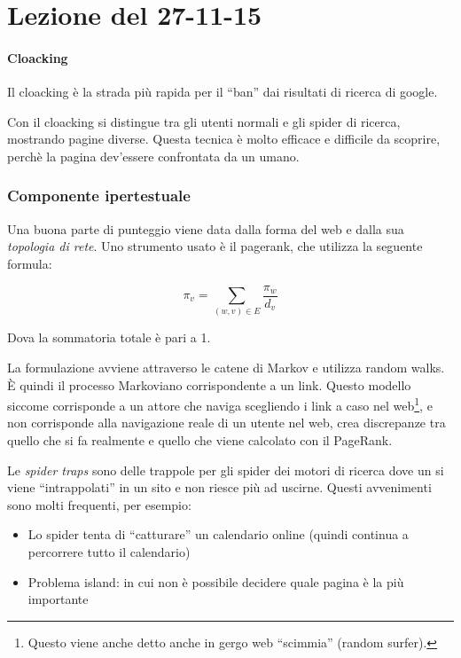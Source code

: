 \section{Lezione del 27-11-15}


\paragraph*{Cloacking}Il cloacking \`e la strada pi\`u rapida per il ``ban'' dai risultati di ricerca di google.

Con il cloacking si distingue tra gli utenti normali e gli spider di ricerca, mostrando pagine diverse. Questa tecnica \`e molto efficace e difficile da scoprire, perch\`e la pagina dev'essere confrontata da un umano.

\subsubsection{Componente ipertestuale}
Una buona parte di punteggio viene data dalla forma del web e dalla sua \textit{topologia di rete}.
Uno strumento usato \`e il pagerank, che utilizza la seguente formula:

\[ \pi_v = \sum_{(w,v) \in E}\frac{\pi_w}{d_v} \]

Dova la sommatoria totale \`e pari a 1.

La formulazione avviene attraverso le catene di Markov e utilizza random walks. \`E quindi il processo Markoviano corrispondente a un link. Questo modello siccome corrisponde a un attore che naviga scegliendo i link a caso nel web\footnote{Questo viene anche detto anche in gergo web ``scimmia'' (random surfer).}, e non corrisponde alla navigazione reale di un utente nel web, crea discrepanze tra quello che si fa realmente e quello che viene calcolato con il PageRank.

Le \textit{spider traps} sono delle trappole per gli spider dei motori di ricerca dove un si viene ``intrappolati'' in un sito e non riesce pi\`u ad uscirne. Questi avvenimenti sono molti frequenti, per esempio:
\begin{itemize}

\item Lo spider tenta di ``catturare'' un calendario online (quindi continua a percorrere tutto il calendario)
\item Problema island: in cui non \`e possibile decidere quale pagina \`e la pi\`u importante

\end{itemize}

